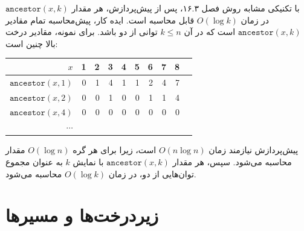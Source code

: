 با تکنیکی مشابه روش فصل ۱۶.۳، پس از پیش‌پردازش، هر مقدار $\texttt{ancestor}(x,k)$ در زمان $O(\log k)$ قابل محاسبه است.
ایده کار، پیش‌محاسبه تمام مقادیر $\texttt{ancestor}(x,k)$ است که در آن $k \le n$ توانی از دو باشد.
برای نمونه، مقادیر درخت بالا چنین است:

\begin{center}
\begin{tabular}{r|rrrrrrrrr}
$x$ & 1 & 2 & 3 & 4 & 5 & 6 & 7 & 8 \\
\hline
$\texttt{ancestor}(x,1)$ & 0 & 1 & 4 & 1 & 1 & 2 & 4 & 7 \\
$\texttt{ancestor}(x,2)$ & 0 & 0 & 1 & 0 & 0 & 1 & 1 & 4 \\
$\texttt{ancestor}(x,4)$ & 0 & 0 & 0 & 0 & 0 & 0 & 0 & 0 \\
$\cdots$ \\
\end{tabular}
\end{center}

پیش‌پردازش نیازمند زمان $O(n \log n)$ است، زیرا برای هر گره $O(\log n)$ مقدار محاسبه می‌شود.
سپس، هر مقدار $\texttt{ancestor}(x,k)$ با نمایش $k$ به عنوان مجموع توان‌هایی از دو، در زمان $O(\log k)$ محاسبه می‌شود.

\section{زیردرخت‌ها و مسیرها}


